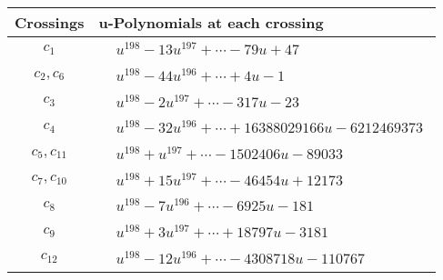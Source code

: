 \documentclass[1p]{elsarticle_modified}
\theoremstyle{definition}
\begin{document}
\begin{tabular}{m{50pt}|m{274pt}}
Crossings & \hspace{64pt}u-Polynomials at each crossing \\
\hline $$\begin{aligned}c_{1}\end{aligned}$$&$\begin{aligned}
&u^{198}-13 u^{197}+\cdots-79 u+47
\end{aligned}$\\
\hline $$\begin{aligned}c_{2},c_{6}\end{aligned}$$&$\begin{aligned}
&u^{198}-44 u^{196}+\cdots+4 u-1
\end{aligned}$\\
\hline $$\begin{aligned}c_{3}\end{aligned}$$&$\begin{aligned}
&u^{198}-2 u^{197}+\cdots-317 u-23
\end{aligned}$\\
\hline $$\begin{aligned}c_{4}\end{aligned}$$&$\begin{aligned}
&u^{198}-32 u^{196}+\cdots+16388029166 u-6212469373
\end{aligned}$\\
\hline $$\begin{aligned}c_{5},c_{11}\end{aligned}$$&$\begin{aligned}
&u^{198}+u^{197}+\cdots-1502406 u-89033
\end{aligned}$\\
\hline $$\begin{aligned}c_{7},c_{10}\end{aligned}$$&$\begin{aligned}
&u^{198}+15 u^{197}+\cdots-46454 u+12173
\end{aligned}$\\
\hline $$\begin{aligned}c_{8}\end{aligned}$$&$\begin{aligned}
&u^{198}-7 u^{196}+\cdots-6925 u-181
\end{aligned}$\\
\hline $$\begin{aligned}c_{9}\end{aligned}$$&$\begin{aligned}
&u^{198}+3 u^{197}+\cdots+18797 u-3181
\end{aligned}$\\
\hline $$\begin{aligned}c_{12}\end{aligned}$$&$\begin{aligned}
&u^{198}-12 u^{196}+\cdots-4308718 u-110767
\end{aligned}$\\
\hline
\end{tabular}\\~\\
\end{document}
